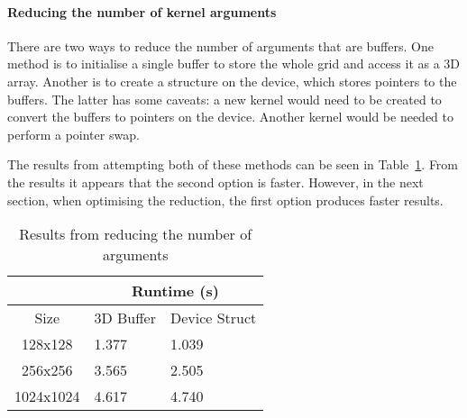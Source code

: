 


\paragraph{Reducing the number of kernel arguments}
There are two ways to reduce the number of arguments that are buffers. One method is to initialise a single buffer to store the whole grid and access it as a 3D array. Another is to create a structure on the device, which stores pointers to the buffers. The latter has some caveats: a new kernel would need to be created to convert the buffers to pointers on the device. Another kernel would be needed to perform a pointer swap. 

The results from attempting both of these methods can be seen in Table~\ref{table:fixing-slow-host}. From the results it appears that the second option is faster. However, in the next section, when optimising the reduction, the first option produces faster results.

\begin{table}[ht]
\vspace{-5mm}
\centering
\caption{Results from reducing the number of arguments}
\vspace{1mm}
\begin{tabular}{|c||p{4.8em}|p{4.8em}|}
    \hline
    & \multicolumn{2}{|c|}{Runtime (s)}\\
    \hline
    Size & 3D Buffer & Device Struct \\
    \hline
    128x128 & 1.377 & 1.039 \\
    \hline
    256x256 & 3.565 & 2.505 \\
    \hline
    1024x1024 & 4.617 & 4.740 \\
    \hline
\end{tabular}
\label{table:fixing-slow-host}
\vspace{-7mm}
\end{table}